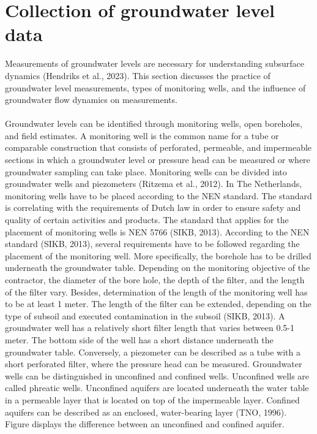\section{Collection of groundwater level data}
Measurements of groundwater levels are necessary for understanding subsurface dynamics (Hendriks et al., 2023). This section discusses the practice of groundwater level measurements, types of monitoring wells, and the influence of groundwater flow dynamics on measurements. \\
\\
Groundwater levels can be identified through monitoring wells, open boreholes, and field estimates. A monitoring well is the common name for a tube or comparable construction that consists of perforated, permeable, and impermeable sections in which a groundwater level or pressure head can be measured or where groundwater sampling can take place. Monitoring wells can be divided into groundwater wells and piezometers (Ritzema et al., 2012). In The Netherlands, monitoring wells have to be placed according to the NEN standard. The standard is correlating with the requirements of Dutch law in order to ensure safety and quality of certain activities and products. The standard that applies for the placement of monitoring wells is NEN 5766 (SIKB, 2013). According to the NEN standard (SIKB, 2013), several requirements have to be followed regarding the placement of the monitoring well. More specifically, the borehole has to be drilled underneath the groundwater table. Depending on the monitoring objective of the contractor, the diameter of the bore hole, the depth of the filter, and the length of the filter vary. Besides, determination of the length of the monitoring well has to be at least 1 meter. The length of the filter can be extended, depending on the type of subsoil and executed contamination in the subsoil (SIKB, 2013). A groundwater well has a relatively short filter length that varies between 0.5-1 meter. The bottom side of the well has a short distance underneath the groundwater table. 
Conversely, a piezometer can be described as a tube with a short perforated filter, where the pressure head can be measured. Groundwater wells can be distinguished in unconfined and confined wells. Unconfined wells are called phreatic wells. Unconfined aquifers are located underneath the water table in a permeable layer that is located on top of the impermeable layer. Confined aquifers can be described as an enclosed, water-bearing layer (TNO, 1996). Figure  displays the difference between an unconfined and confined aquifer. 
